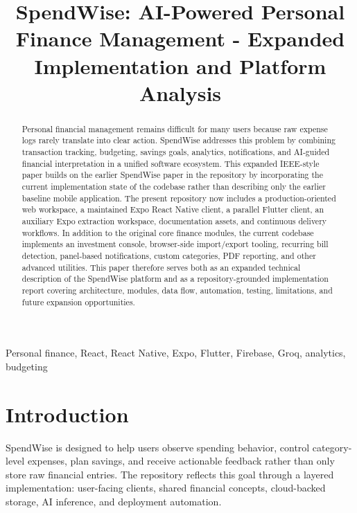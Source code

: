\documentclass[conference]{IEEEtran}
\begin{document}
\title{SpendWise: AI-Powered Personal Finance Management - Expanded Implementation and Platform Analysis}

\author{
\and
{}
}

\maketitle

\begin{abstract}
Personal financial management remains difficult for many users because raw expense logs rarely translate into clear action. SpendWise addresses this problem by combining transaction tracking, budgeting, savings goals, analytics, notifications, and AI-guided financial interpretation in a unified software ecosystem. This expanded IEEE-style paper builds on the earlier SpendWise paper in the repository by incorporating the current implementation state of the codebase rather than describing only the earlier baseline mobile application. The present repository now includes a production-oriented web workspace, a maintained Expo React Native client, a parallel Flutter client, an auxiliary Expo extraction workspace, documentation assets, and continuous delivery workflows. In addition to the original core finance modules, the current codebase implements an investment console, browser-side import/export tooling, recurring bill detection, panel-based notifications, custom categories, PDF reporting, and other advanced utilities. This paper therefore serves both as an expanded technical description of the SpendWise platform and as a repository-grounded implementation report covering architecture, modules, data flow, automation, testing, limitations, and future expansion opportunities.
\end{abstract}

\begin{IEEEkeywords}
Personal finance, React, React Native, Expo, Flutter, Firebase, Groq, analytics, budgeting
\end{IEEEkeywords}

\section{Introduction}
SpendWise is designed to help users observe spending behavior, control category-level expenses, plan savings, and receive actionable feedback rather than only store raw financial entries. The repository reflects this goal through a layered implementation: user-facing clients, shared financial concepts, cloud-backed storage, AI inference, and deployment automation.
\end{document}
